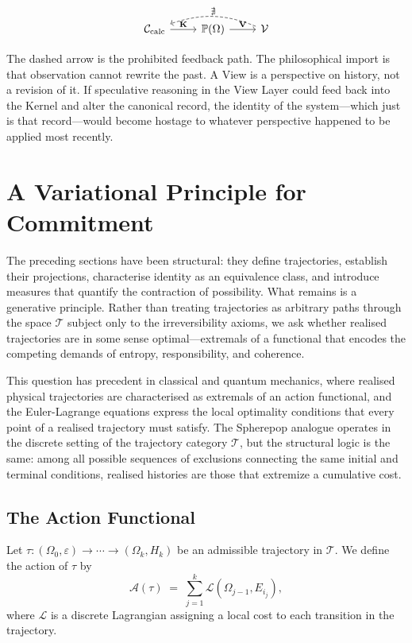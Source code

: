 \documentclass[12pt]{article}
\theoremstyle{plain}
\theoremstyle{definition}
\theoremstyle{remark}
\newcommand{\PathCat}{\mathbb{P}(\Omega)}
\newcommand{\ViewCat}{\mathcal{V}}
\newcommand{\KernelFun}{\mathbf{K}}
\newcommand{\ViewFun}{\mathbf{V}}
\begin{document}
\[
  \begin{tikzcd}
    \mathcal{C}_{\mathrm{calc}} \arrow[r, "\KernelFun"] &
    \PathCat \arrow[r, "\ViewFun"] &
    \ViewCat \arrow[ll, dashed, "\nexists"', bend right=20]
  \end{tikzcd}
\]

The dashed arrow is the prohibited feedback path.  The philosophical import is
that observation cannot rewrite the past.  A View is a perspective on history,
not a revision of it.  If speculative reasoning in the View Layer could feed
back into the Kernel and alter the canonical record, the identity of the
system---which just is that record---would become hostage to whatever perspective
happened to be applied most recently.


\section{A Variational Principle for Commitment}
\label{sec:variational}

The preceding sections have been structural: they define trajectories, establish
their projections, characterise identity as an equivalence class, and introduce
measures that quantify the contraction of possibility.  What remains is a
generative principle.  Rather than treating trajectories as arbitrary paths
through the space $\mathcal{T}$ subject only to the irreversibility axioms, we
ask whether realised trajectories are in some sense optimal---extremals of a
functional that encodes the competing demands of entropy, responsibility, and
coherence.

This question has precedent in classical and quantum mechanics, where realised
physical trajectories are characterised as extremals of an action functional,
and the Euler-Lagrange equations express the local optimality conditions that
every point of a realised trajectory must satisfy.  The Spherepop analogue
operates in the discrete setting of the trajectory category $\mathcal{T}$, but
the structural logic is the same: among all possible sequences of exclusions
connecting the same initial and terminal conditions, realised histories are those
that extremize a cumulative cost.

\subsection{The Action Functional}

Let $\tau : (\Omega_0, \varepsilon) \to \cdots \to (\Omega_k, H_k)$ be an
admissible trajectory in $\mathcal{T}$.  We define the action of $\tau$ by
\[
  \mathcal{A}(\tau) \;=\; \sum_{j=1}^{k} \mathcal{L}(\Omega_{j-1}, E_{i_j}),
\]
where $\mathcal{L}$ is a discrete Lagrangian assigning a local cost to each
transition in the trajectory.
\end{document}
